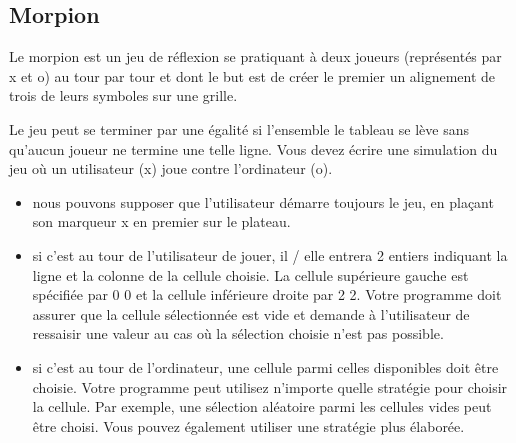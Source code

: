 \documentclass[a4paper]{article}
\begin{document}
\subsection{Morpion}
Le morpion est un jeu de réflexion se pratiquant à deux joueurs (représentés par x et o) au tour par tour et dont le but est de créer le premier un alignement de trois de leurs symboles sur une grille.

 Le jeu peut se terminer par une égalité si l'ensemble le tableau se lève sans qu'aucun joueur ne termine une telle ligne. Vous devez écrire une simulation du jeu où un utilisateur (x) joue contre l'ordinateur (o). 


\begin{itemize}
\item nous pouvons supposer que l'utilisateur démarre toujours le jeu, en plaçant son marqueur x en premier sur le plateau.
\item si c'est au tour de l'utilisateur de jouer, il / elle entrera 2 entiers indiquant la  ligne et la colonne
de la cellule choisie. La cellule supérieure gauche est spécifiée par 0 0 et la cellule inférieure droite par 2 2. Votre programme doit assurer que la cellule sélectionnée est vide et demande à l'utilisateur de ressaisir une valeur au cas où la sélection choisie n'est pas possible.
\item si c'est au tour de l'ordinateur, une cellule parmi celles disponibles doit être choisie. Votre programme peut
utilisez n'importe quelle stratégie pour choisir la cellule. Par exemple, une sélection aléatoire parmi les cellules vides peut être choisi. Vous pouvez également utiliser une stratégie plus élaborée.
\end{itemize}
\end{document}
